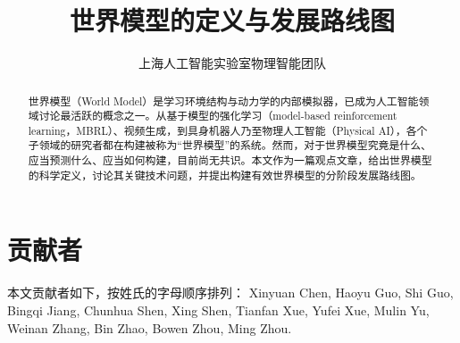 \documentclass{article}
\title{世界模型的定义与发展路线图}
\author{上海人工智能实验室物理智能团队}
\theoremstyle{definition}
\begin{document}
\maketitle


\begin{abstract}
世界模型（World Model）是学习环境结构与动力学的内部模拟器，已成为人工智能领域讨论最活跃的概念之一。从基于模型的强化学习（model-based reinforcement learning，MBRL）、视频生成，到具身机器人乃至物理人工智能（Physical AI），各个子领域的研究者都在构建被称为“世界模型”的系统。然而，对于世界模型究竟是什么、应当预测什么、应当如何构建，目前尚无共识。本文作为一篇观点文章，给出世界模型的科学定义，讨论其关键技术问题，并提出构建有效世界模型的分阶段发展路线图。
\end{abstract}

\tableofcontents
\clearpage












\section*{贡献者}
本文贡献者如下，按姓氏的字母顺序排列：
Xinyuan Chen, Haoyu Guo, Shi Guo, Bingqi Jiang, Chunhua Shen, Xing Shen, Tianfan Xue, Yufei Xue, Mulin Yu, Weinan Zhang, Bin Zhao, Bowen Zhou, Ming Zhou.





\end{document}
